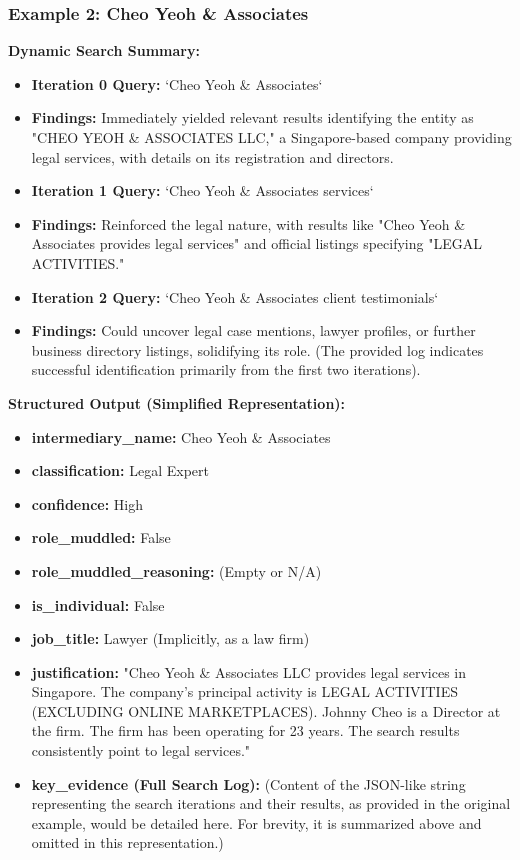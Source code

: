 \subsubsection*{Example 2: Cheo Yeoh \& Associates}
\textbf{Dynamic Search Summary:}
\begin{itemize}
    \item \textbf{Iteration 0 Query:} `Cheo Yeoh \& Associates`
    \item \textbf{Findings:} Immediately yielded relevant results identifying the entity as "CHEO YEOH \& ASSOCIATES LLC," a Singapore-based company providing legal services, with details on its registration and directors.
    \item \textbf{Iteration 1 Query:} `Cheo Yeoh \& Associates services`
    \item \textbf{Findings:} Reinforced the legal nature, with results like "Cheo Yeoh \& Associates provides legal services" and official listings specifying "LEGAL ACTIVITIES."
    \item \textbf{Iteration 2 Query:} `Cheo Yeoh \& Associates client testimonials`
    \item \textbf{Findings:} Could uncover legal case mentions, lawyer profiles, or further business directory listings, solidifying its role. (The provided log indicates successful identification primarily from the first two iterations).
\end{itemize}

\textbf{Structured Output (Simplified Representation):}
\begin{itemize}
    \item \textbf{intermediary\_name:} Cheo Yeoh \& Associates
    \item \textbf{classification:} Legal Expert
    \item \textbf{confidence:} High
    \item \textbf{role\_muddled:} False
    \item \textbf{role\_muddled\_reasoning:} (Empty or N/A)
    \item \textbf{is\_individual:} False
    \item \textbf{job\_title:} Lawyer (Implicitly, as a law firm)
    \item \textbf{justification:} "Cheo Yeoh \& Associates LLC provides legal services in Singapore. The company's principal activity is LEGAL ACTIVITIES (EXCLUDING ONLINE MARKETPLACES). Johnny Cheo is a Director at the firm. The firm has been operating for 23 years. The search results consistently point to legal services."
    \item \textbf{key\_evidence (Full Search Log):} (Content of the JSON-like string representing the search iterations and their results, as provided in the original example, would be detailed here. For brevity, it is summarized above and omitted in this representation.)
\end{itemize}

